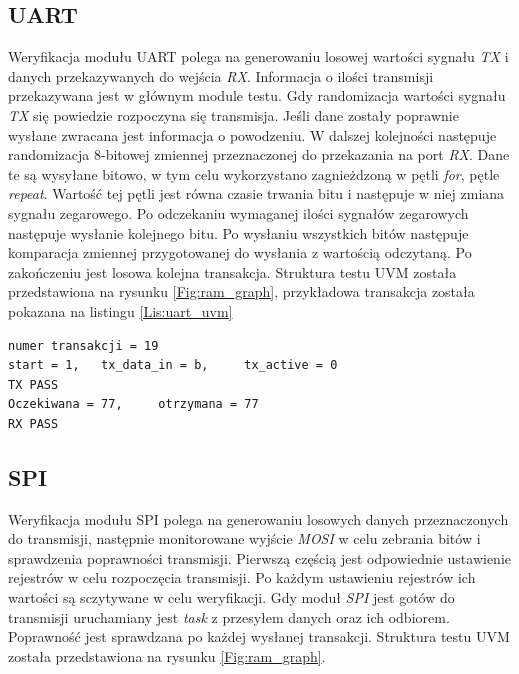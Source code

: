 \documentclass[11pt,a4paper]{article}
\begin{document}
\subsection{UART}
\hspace{5mm} Weryfikacja modułu UART polega na generowaniu losowej wartości sygnału \textit{TX} i danych przekazywanych do wejścia \textit{RX}. Informacja o ilości transmisji przekazywana jest w głównym module testu. Gdy randomizacja wartości sygnału \textit{TX} się powiedzie rozpoczyna się transmisja. Jeśli dane zostały poprawnie wysłane zwracana jest informacja o powodzeniu. W dalszej kolejności następuje randomizacja 8-bitowej zmiennej przeznaczonej do przekazania na port \textit{RX}. Dane te są wysyłane bitowo, w tym celu wykorzystano zagnieżdzoną w pętli \textit{for}, pętle \textit{repeat}. Wartość tej pętli jest równa czasie trwania bitu i następuje w niej zmiana sygnału zegarowego. Po odczekaniu wymaganej ilości sygnałów zegarowych następuje wysłanie kolejnego bitu. Po wysłaniu wszystkich bitów następuje komparacja zmiennej przygotowanej do wysłania z wartością odczytaną. Po zakończeniu jest losowa kolejna transakcja. Struktura testu UVM została przedstawiona na rysunku \ref{Fig:ram_graph}, przykładowa transakcja została pokazana na listingu \ref{Lis:uart_uvm}
 \begin{minipage}{\textwidth}
\begin{scriptsize}
\begin{lstlisting}[label=Lis:uart_uvm,caption=Przykładowa transakcja UART]
numer transakcji = 19
start = 1, 	 tx_data_in = b,	 tx_active = 0
TX PASS
Oczekiwana = 77, 	 otrzymana = 77
RX PASS
\end{lstlisting}
\end{scriptsize}
\end{minipage}
\subsection{SPI}
\hspace{5mm} Weryfikacja modułu SPI polega na generowaniu losowych danych przeznaczonych do transmisji, następnie monitorowane wyjście \textit{MOSI} w celu zebrania bitów i sprawdzenia poprawności transmisji. Pierwszą częścią jest odpowiednie ustawienie rejestrów w celu rozpoczęcia transmisji. Po każdym ustawieniu rejestrów ich wartości są sczytywane w celu weryfikacji. Gdy moduł \textit{SPI} jest gotów do transmisji uruchamiany jest \textit{task} z przesyłem danych oraz ich odbiorem. Poprawność jest sprawdzana po każdej wysłanej transakcji. Struktura testu UVM została przedstawiona na rysunku \ref{Fig:ram_graph}.
\end{document}
